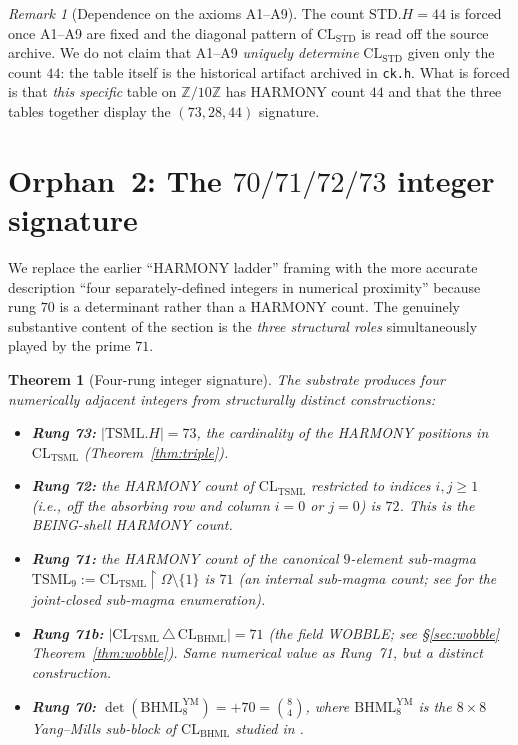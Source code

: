 \documentclass[11pt,reqno]{amsart}
\theoremstyle{plain}
\newtheorem{theorem}{Theorem}[section]
\theoremstyle{definition}
\theoremstyle{remark}
\newtheorem*{remark}{Remark}
\newcommand{\Z}{\mathbb{Z}}
\newcommand{\TSML}{\mathrm{TSML}}
\newcommand{\BHML}{\mathrm{BHML}}
\newcommand{\STD}{\mathrm{STD}}
\begin{document}
\begin{remark}[Dependence on the axioms A1--A9]
The count $\STD.H = 44$ is forced once A1--A9 are fixed and the
diagonal pattern of $\mathrm{CL}_\STD$ is read off the source archive.
We do not claim that A1--A9 \emph{uniquely determine}
$\mathrm{CL}_\STD$ given only the count $44$: the table itself is the
historical artifact archived in \texttt{ck.h}. What is forced is that
\emph{this specific} table on $\Z/10\Z$ has HARMONY count $44$ and
that the three tables together display the
$(73,28,44)$ signature.
\end{remark}

\section{Orphan~2: The $70/71/72/73$ integer signature}
\label{sec:ladder}

We replace the earlier ``HARMONY ladder'' framing
\cite[\S J.1.A.ii]{FoundationsModule} with the more accurate
description ``four separately-defined integers in numerical proximity''
because rung $70$ is a determinant rather than a HARMONY count. The
genuinely substantive content of the section is the
\emph{three structural roles} simultaneously played by the prime $71$.

\begin{theorem}[Four-rung integer signature]\label{thm:ladder}
The substrate produces four numerically adjacent integers from
structurally distinct constructions:
\begin{itemize}[leftmargin=2em]
\item \textbf{Rung 73:} $|\TSML.H| = 73$, the cardinality of the
HARMONY positions in $\mathrm{CL}_\TSML$ (Theorem~\ref{thm:triple}).
\item \textbf{Rung 72:} the HARMONY count of $\mathrm{CL}_\TSML$
restricted to indices $i,j \ge 1$ (i.e., off the absorbing row and
column $i=0$ or $j=0$) is $72$. This is the
\emph{BEING-shell} HARMONY count.
\item \textbf{Rung 71:} the HARMONY count of the canonical
$9$-element sub-magma
$\TSML_9 := \mathrm{CL}_\TSML\!\restriction\!\Omega\setminus\{1\}$
is $71$ (an internal sub-magma count; see
\cite{SandersGishFourCore} for the joint-closed sub-magma
enumeration).
\item \textbf{Rung 71b:} $\bigl|\mathrm{CL}_\TSML \,\triangle\,
\mathrm{CL}_\BHML\bigr| = 71$ (the field WOBBLE; see
\S\ref{sec:wobble} Theorem~\ref{thm:wobble}). \emph{Same numerical
value as Rung~71, but a distinct construction.}
\item \textbf{Rung 70:} $\det(\mathrm{BHML}_8^{\mathrm{YM}}) = +70 =
\binom{8}{4}$, where $\mathrm{BHML}_8^{\mathrm{YM}}$ is the
$8\times 8$ Yang--Mills sub-block of $\mathrm{CL}_\BHML$ studied in
\cite{SandersGishFpExtension}.
\end{itemize}
\end{theorem}
\end{document}

